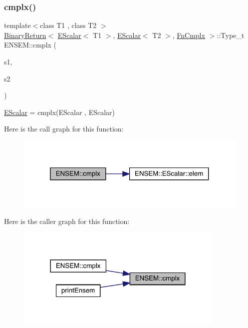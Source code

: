 \subsubsection{\texorpdfstring{cmplx()}{cmplx()}}
{\footnotesize\ttfamily template$<$class T1 , class T2 $>$ \\
\mbox{\hyperlink{structENSEM_1_1BinaryReturn}{Binary\+Return}}$<$ \mbox{\hyperlink{classENSEM_1_1EScalar}{E\+Scalar}}$<$ T1 $>$, \mbox{\hyperlink{classENSEM_1_1EScalar}{E\+Scalar}}$<$ T2 $>$, \mbox{\hyperlink{structENSEM_1_1FnCmplx}{Fn\+Cmplx}} $>$\+::Type\+\_\+t E\+N\+S\+E\+M\+::cmplx (\begin{DoxyParamCaption}\item[{const \mbox{\hyperlink{classENSEM_1_1EScalar}{E\+Scalar}}$<$ T1 $>$ \&}]{s1,  }\item[{const \mbox{\hyperlink{classENSEM_1_1EScalar}{E\+Scalar}}$<$ T2 $>$ \&}]{s2 }\end{DoxyParamCaption})\hspace{0.3cm}{\ttfamily [inline]}}



\mbox{\hyperlink{classENSEM_1_1EScalar}{E\+Scalar}} = cmplx(\+E\+Scalar , E\+Scalar) 

Here is the call graph for this function\+:
\nopagebreak
\begin{figure}[H]
\begin{center}
\leavevmode
\includegraphics[width=319pt]{d4/dca/group__escalar_gaccbb7d66b912e8f0972f4e50095f296e_cgraph}
\end{center}
\end{figure}
Here is the caller graph for this function\+:
\nopagebreak
\begin{figure}[H]
\begin{center}
\leavevmode
\includegraphics[width=282pt]{d4/dca/group__escalar_gaccbb7d66b912e8f0972f4e50095f296e_icgraph}
\end{center}
\end{figure}
\mbox{\label{group__escalar_ga291c7e9b7f872b3e6db0d75ff3421b6a}} 
